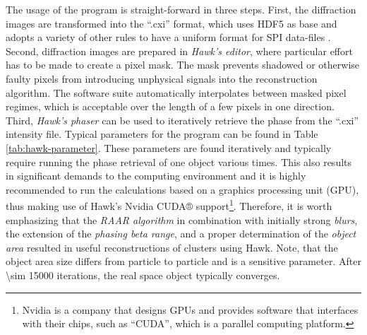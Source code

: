 The usage of the program is straight-forward in three steps. First, the diffraction images are transformed into the ``.cxi'' format, which uses HDF5 as base and adopts a variety of other rules to have a uniform format for SPI data-files \citep{Maia-2012-NatMet}. Second, diffraction images are prepared in \textit{Hawk's editor}, where particular effort has to be made to create a pixel mask. The mask prevents shadowed or otherwise faulty pixels from introducing unphysical signals into the reconstruction algorithm. The software suite automatically interpolates between masked pixel regimes, which is acceptable over the length of a few pixels in one direction. Third, \textit{Hawk's phaser} can be used to iteratively retrieve the phase from the ``.cxi'' intensity file. Typical parameters for the program can be found in Table \ref{tab:hawk-parameter}. These parameters are found iteratively and typically require running the phase retrieval of one object various times. This also results in significant demands to the computing environment and it is highly recommended to run the calculations based on a graphics processing unit (GPU), thus making use of Hawk's Nvidia CUDA® support\footnote{Nvidia is a company that designs GPUs and provides software that interfaces with their chips, such as ``CUDA'', which is a parallel computing platform.}. Therefore, it is worth emphasizing that the \textit{RAAR algorithm} \cite{Luke-2005-IP} in combination with initially strong \textit{blurs}, the extension of the \textit{phasing beta range}, and a proper determination of the \textit{object area} resulted in useful reconstructions of clusters using Hawk. Note, that the object area size differs from particle to particle and is a sensitive parameter. After \num[fixed-exponent=0]{\sim 15000} iterations, the real space object typically converges.
%
%
%
